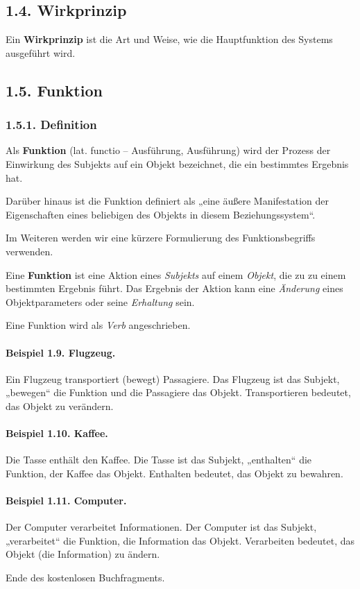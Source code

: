 \documentclass[11pt,a4paper]{article}
\begin{document}
\subsection*{1.4. Wirkprinzip}

Ein \textbf{Wirkprinzip} ist die Art und Weise, wie die Hauptfunktion des
Systems ausgeführt wird.

\subsection*{1.5. Funktion}
\subsubsection*{1.5.1. Definition}

Als \textbf{Funktion} (lat. functio -- Ausführung, Ausführung) wird der
Prozess der Einwirkung des Subjekts auf ein Objekt bezeichnet, die ein
bestimmtes Ergebnis hat.

Darüber hinaus ist die Funktion definiert als „eine äußere Manifestation der
Eigenschaften eines beliebigen des Objekts in diesem Beziehungssystem“.

Im Weiteren werden wir eine kürzere Formulierung des Funktionsbegriffs
verwenden.

Eine \textbf{Funktion} ist eine Aktion eines \emph{Subjekts} auf einem
\emph{Objekt}, die zu zu einem bestimmten Ergebnis führt. Das Ergebnis der
Aktion kann eine \emph{Änderung} eines Objektparameters oder seine
\emph{Erhaltung} sein.

Eine Funktion wird als \emph{Verb} angeschrieben.

\paragraph{Beispiel 1.9. Flugzeug.}
Ein Flugzeug transportiert (bewegt) Passagiere. Das Flugzeug ist das Subjekt,
„bewegen“ die Funktion und die Passagiere das Objekt. Transportieren bedeutet,
das Objekt zu verändern.

\paragraph{Beispiel 1.10. Kaffee.}
Die Tasse enthält den Kaffee. Die Tasse ist das Subjekt, „enthalten“ die
Funktion, der Kaffee das Objekt. Enthalten bedeutet, das Objekt zu bewahren.

\paragraph{Beispiel 1.11. Computer.}
Der Computer verarbeitet Informationen. Der Computer ist das Subjekt,
„verarbeitet“ die Funktion, die Information das Objekt. Verarbeiten bedeutet,
das Objekt (die Information) zu ändern.

\begin{center}
  Ende des kostenlosen Buchfragments.
\end{center}
\end{document}
